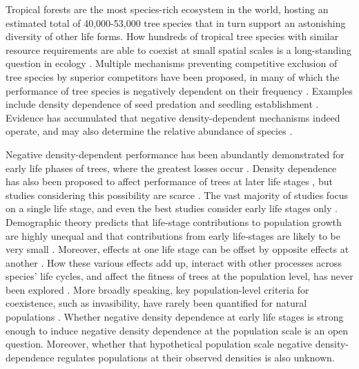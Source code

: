 \documentclass[b5paper,justified]{tufte-book} %
\begin{document}
\begin{fullwidth}
Tropical forests are the most species-rich ecosystem in the world, hosting an estimated total of 40,000-53,000 tree species \citep{Slik2015} that in turn support an astonishing diversity of other life forms. How hundreds of tropical tree species with similar resource requirements are able to coexist at small spatial scales is a long-standing question in ecology \citep{Wright2002, Leigh2004}. Multiple mechanisms preventing competitive exclusion of tree species by superior competitors have been proposed, in many of which the performance of tree species is negatively dependent on their frequency \citep{Bagchi2010, Comita2014}. Examples include density dependence of seed predation \citep{Lewis2008} and seedling establishment \citep{Harms2000a}. Evidence has accumulated that negative density-dependent mechanisms indeed operate, and may also determine the relative abundance of species \citep{Comita2010,  Mangan2010, Johnson2012}. 

Negative density-dependent performance has been abundantly demonstrated for early life phases of trees, where the greatest losses occur \citep[e.g.][]{Crawley2000, Comita2014}.  Density dependence has also been proposed to affect performance of trees at later life stages \citep{Jones2008}, but studies considering this possibility are scarce \citep{Zhu2015}. The vast majority of studies focus on a single life stage, and even the best  studies consider early life stages only \citep{Comita2010, Mangan2010, Swamy2010, Johnson2012, Bagchi2014}.  Demographic theory  predicts that life-stage contributions to population growth are highly unequal and that contributions from early life-stages are likely to be very small \citep[e.g.][]{DeKroon2000}. Moreover, effects at one life stage can be offset by opposite effects at another \citep{Visser2016}. How these various effects add up, interact with other processes across species' life cycles, and affect the fitness of trees at the population level, has never been explored \citep{Caughlin2014}.  More broadly speaking, key population-level criteria for coexistence, such as invasibility, have rarely been quantified for natural populations \citep{Siepielski2010}. Whether negative density dependence at early life stages is strong enough to induce negative density dependence at the population scale is an open question. Moreover, whether that hypothetical population scale negative density-dependence regulates populations at their observed densities is also unknown.


\end{fullwidth}
\end{document}
